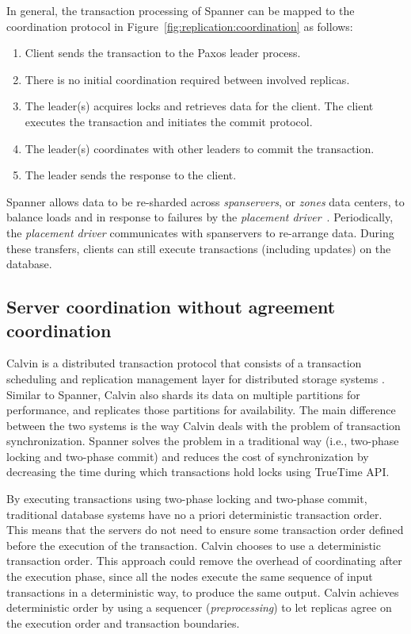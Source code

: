 In general, the transaction processing of Spanner can be mapped to the
coordination protocol in Figure~\ref{fig:replication:coordination} as follows:
\begin{enumerate}
  \item Client sends the transaction to the Paxos leader process.
  \item There is no initial coordination required between involved replicas.
  \item The leader(s) acquires locks and retrieves data for the client. The client
  executes the transaction and initiates the commit protocol.
  \item The leader(s) coordinates with other leaders to commit the transaction.
  \item The leader sends the response to the client.
\end{enumerate}

Spanner allows data to be re-sharded across \emph{spanservers}, or \emph{zones}
data centers, to balance loads and in response to failures by the
\emph{placement driver}~\cite{corbett2013spanner}. Periodically, the
\emph{placement driver} communicates with spanservers to re-arrange data. During
these transfers, clients can still execute transactions (including updates) on
the database.

\subsection{Server coordination without agreement coordination}

Calvin is a distributed transaction protocol that consists of a transaction
scheduling and replication management layer for distributed storage systems
\cite{calvin}. Similar to Spanner, Calvin also shards its data on multiple
partitions for performance, and replicates those partitions for availability. The
main difference between the two systems is the way Calvin deals with the problem
of transaction synchronization. Spanner solves the problem in a traditional
way (i.e., two-phase locking and two-phase commit) and reduces the cost of synchronization
by decreasing the time during which transactions hold locks using
TrueTime API.

By executing transactions using two-phase locking and two-phase commit, 
traditional database systems have no a priori deterministic transaction order. 
This means that the servers do not need to ensure some transaction order defined before the execution of the
transaction. Calvin chooses to use a deterministic transaction order. This
approach could remove the overhead of coordinating after the execution phase,
since all the nodes execute the same sequence of input transactions in a deterministic way,
to produce the same output. Calvin achieves deterministic order by using
a sequencer (\emph{preprocessing}) to let replicas agree on the execution order and
transaction boundaries.

